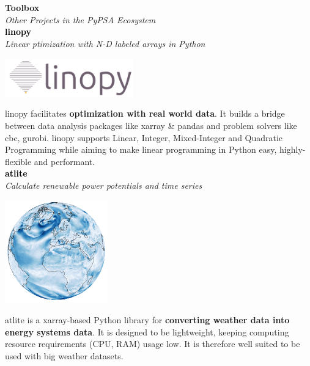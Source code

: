 \documentclass[a0,portrait]{a0poster}
\begin{document}
\begin{multicols}{3}
\noindent \textcolor{red100}{\huge \textbf{Toolbox}}
\\
\textit{Other Projects in the PyPSA Ecosystem}
\\

\noindent \textcolor{black}{\Large \textbf{linopy}}
\\
\textit{Linear ptimization with N-D labeled arrays in Python}
\vspace{0.5em}
\begin{center}
  \includegraphics[width=15em]{linopy.pdf}
\end{center}
\vspace{0.5em}
linopy facilitates \textbf{optimization with real world data}. It builds a bridge 
between data analysis packages like xarray \& pandas and problem solvers like cbc, 
gurobi. linopy supports Linear, Integer, Mixed-Integer and Quadratic Programming while 
aiming to make linear programming in Python easy, highly-flexible and performant. \\

\noindent \textcolor{black}{\Large \textbf{atlite}}
\\
\textit{Calculate renewable power potentials and time series}
\vspace{0.5em}
\begin{center}
  \includegraphics[width=12em]{atlite.png}
\end{center}
\vspace{0.5em}
atlite is a xarray-based Python library for \textbf{converting weather data into energy 
systems data}. It is designed to be lightweight, keeping computing resource 
requirements (CPU, RAM) usage low. It is therefore well suited to be used with big 
weather datasets. \\


\end{multicols}
\end{document}
